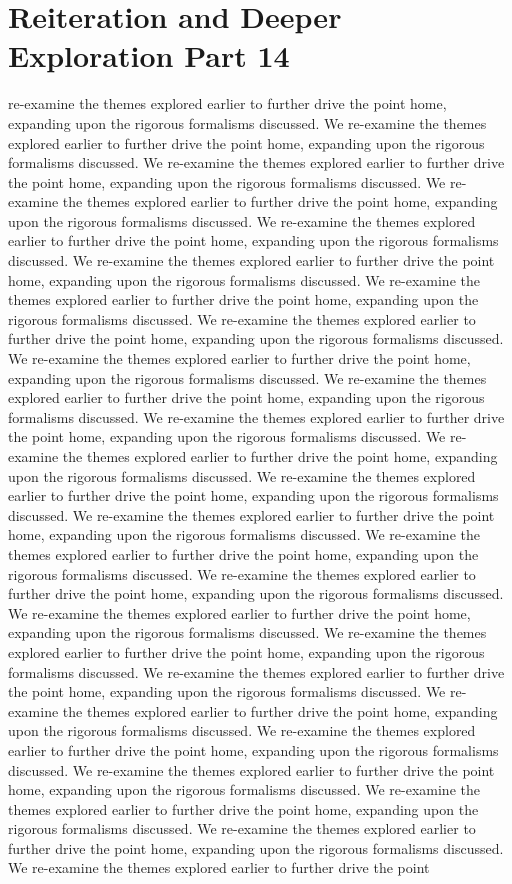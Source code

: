 \section{Reiteration and Deeper Exploration Part 14}\nWe re-examine the themes explored earlier to further drive the point home, expanding upon the rigorous formalisms discussed. We re-examine the themes explored earlier to further drive the point home, expanding upon the rigorous formalisms discussed. We re-examine the themes explored earlier to further drive the point home, expanding upon the rigorous formalisms discussed. We re-examine the themes explored earlier to further drive the point home, expanding upon the rigorous formalisms discussed. We re-examine the themes explored earlier to further drive the point home, expanding upon the rigorous formalisms discussed. We re-examine the themes explored earlier to further drive the point home, expanding upon the rigorous formalisms discussed. We re-examine the themes explored earlier to further drive the point home, expanding upon the rigorous formalisms discussed. We re-examine the themes explored earlier to further drive the point home, expanding upon the rigorous formalisms discussed. We re-examine the themes explored earlier to further drive the point home, expanding upon the rigorous formalisms discussed. We re-examine the themes explored earlier to further drive the point home, expanding upon the rigorous formalisms discussed. We re-examine the themes explored earlier to further drive the point home, expanding upon the rigorous formalisms discussed. We re-examine the themes explored earlier to further drive the point home, expanding upon the rigorous formalisms discussed. We re-examine the themes explored earlier to further drive the point home, expanding upon the rigorous formalisms discussed. We re-examine the themes explored earlier to further drive the point home, expanding upon the rigorous formalisms discussed. We re-examine the themes explored earlier to further drive the point home, expanding upon the rigorous formalisms discussed. We re-examine the themes explored earlier to further drive the point home, expanding upon the rigorous formalisms discussed. We re-examine the themes explored earlier to further drive the point home, expanding upon the rigorous formalisms discussed. We re-examine the themes explored earlier to further drive the point home, expanding upon the rigorous formalisms discussed. We re-examine the themes explored earlier to further drive the point home, expanding upon the rigorous formalisms discussed. We re-examine the themes explored earlier to further drive the point home, expanding upon the rigorous formalisms discussed. We re-examine the themes explored earlier to further drive the point home, expanding upon the rigorous formalisms discussed. We re-examine the themes explored earlier to further drive the point home, expanding upon the rigorous formalisms discussed. We re-examine the themes explored earlier to further drive the point home, expanding upon the rigorous formalisms discussed. We re-examine the themes explored earlier to further drive the point home, expanding upon the rigorous formalisms discussed. We re-examine the themes explored earlier to further drive the point 